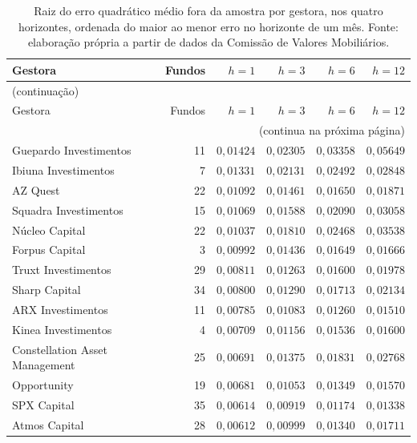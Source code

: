 \documentclass[12pt,a4paper]{article}
\begin{document}
\begin{center}\scriptsize
\begin{longtable}{@{}lrrrrr@{}}
\caption{Raiz do erro quadrático médio fora da amostra por gestora, nos quatro horizontes,
ordenada do maior ao menor erro no horizonte de um mês. Fonte: elaboração própria a partir de
dados da Comissão de Valores Mobiliários.}
\label{tab:rmse-gestora}\\
\toprule
Gestora & Fundos & $h{=}1$ & $h{=}3$ & $h{=}6$ & $h{=}12$ \\
\midrule
\endfirsthead
\multicolumn{6}{l}{(continuação)}\\
\toprule
Gestora & Fundos & $h{=}1$ & $h{=}3$ & $h{=}6$ & $h{=}12$ \\
\midrule
\endhead
\midrule
\multicolumn{6}{r}{(continua na próxima página)}\\
\endfoot
\bottomrule
\endlastfoot
Guepardo Investimentos & 11 & $0{,}01424$ & $0{,}02305$ & $0{,}03358$ & $0{,}05649$ \\
Ibiuna Investimentos & 7 & $0{,}01331$ & $0{,}02131$ & $0{,}02492$ & $0{,}02848$ \\
AZ Quest & 22 & $0{,}01092$ & $0{,}01461$ & $0{,}01650$ & $0{,}01871$ \\
Squadra Investimentos & 15 & $0{,}01069$ & $0{,}01588$ & $0{,}02090$ & $0{,}03058$ \\
Núcleo Capital & 22 & $0{,}01037$ & $0{,}01810$ & $0{,}02468$ & $0{,}03538$ \\
Forpus Capital & 3 & $0{,}00992$ & $0{,}01436$ & $0{,}01649$ & $0{,}01666$ \\
Truxt Investimentos & 29 & $0{,}00811$ & $0{,}01263$ & $0{,}01600$ & $0{,}01978$ \\
Sharp Capital & 34 & $0{,}00800$ & $0{,}01290$ & $0{,}01713$ & $0{,}02134$ \\
ARX Investimentos & 11 & $0{,}00785$ & $0{,}01083$ & $0{,}01260$ & $0{,}01510$ \\
Kinea Investimentos & 4 & $0{,}00709$ & $0{,}01156$ & $0{,}01536$ & $0{,}01600$ \\
Constellation Asset Management & 25 & $0{,}00691$ & $0{,}01375$ & $0{,}01831$ & $0{,}02768$ \\
Opportunity & 19 & $0{,}00681$ & $0{,}01053$ & $0{,}01349$ & $0{,}01570$ \\
SPX Capital & 35 & $0{,}00614$ & $0{,}00919$ & $0{,}01174$ & $0{,}01338$ \\
Atmos Capital & 28 & $0{,}00612$ & $0{,}00999$ & $0{,}01340$ & $0{,}01711$ \\

\end{longtable}
\end{center}
\end{document}
